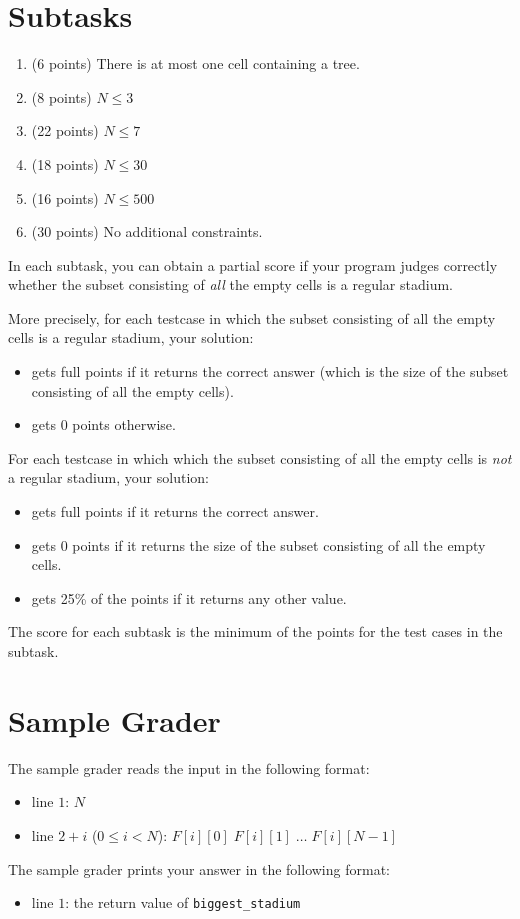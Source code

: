\section*{Subtasks}

\begin{enumerate}
\def\labelenumi{\arabic{enumi}.}
\item
  (6 points) There is at most one cell containing a tree.
\item
  (8 points) $N \le 3$
\item
  (22 points) $N \le 7$
\item
  (18 points) $N \le 30$
\item
  (16 points) $N \le 500$
\item
  (30 points) No additional constraints.
\end{enumerate}

In each subtask, you can obtain a partial score if your program judges
correctly whether the subset consisting of \emph{all} the empty cells is
a regular stadium.

More precisely, for each testcase in which the subset consisting of all
the empty cells is a regular stadium, your solution:
\begin{itemize}
  \item gets full points
  if it returns the correct answer (which is the size of the subset
  consisting of all the empty cells).
  \item gets 0 points otherwise.
\end{itemize}

For each testcase in which which the subset consisting of all the empty
cells is \emph{not} a regular stadium, your solution:
\begin{itemize}
  \item gets full points if it returns the correct answer.
  \item gets 0 points if it returns the size
  of the subset consisting of all the empty cells.
  \item gets 25\% of the points if it returns any other value.
\end{itemize}

The score for each subtask is the minimum of the points for the test
cases in the subtask.

\section*{Sample Grader}

The sample grader reads the input in the following format:

\begin{itemize}
\item
  line $1$: $N$
\item
  line $2 + i$ ($0 \le i < N$):
  $F[i][0] \; F[i][1] \; \ldots \; F[i][N - 1]$
\end{itemize}

The sample grader prints your answer in the following format:
\begin{itemize}
  \item line $1$: the return value of \texttt{biggest\_stadium}  
\end{itemize}